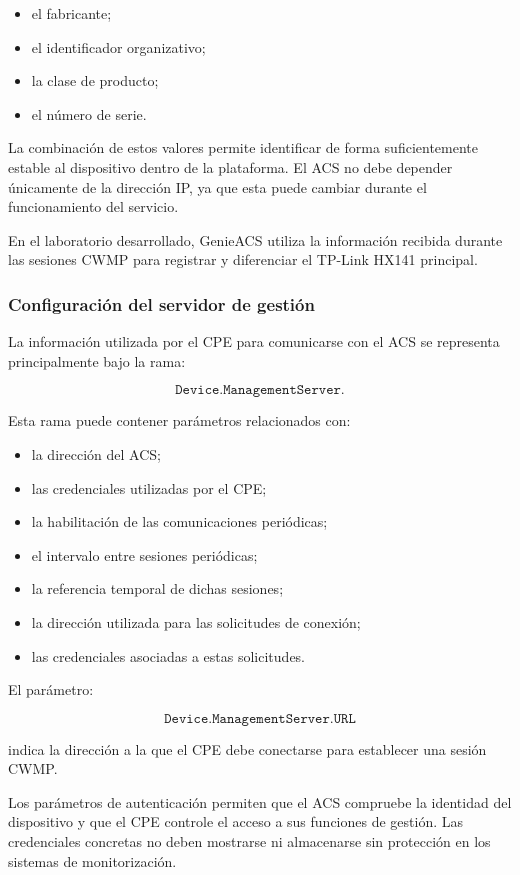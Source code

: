 \begin{itemize}
    \item el fabricante;
    \item el identificador organizativo;
    \item la clase de producto;
    \item el número de serie.
\end{itemize}

La combinación de estos valores permite identificar de forma
suficientemente estable al dispositivo dentro de la plataforma. El ACS no
debe depender únicamente de la dirección IP, ya que esta puede cambiar
durante el funcionamiento del servicio.

En el laboratorio desarrollado, GenieACS utiliza la información recibida
durante las sesiones CWMP para registrar y diferenciar el TP-Link HX141
principal.


\subsubsection*{Configuración del servidor de gestión}

La información utilizada por el CPE para comunicarse con el ACS se
representa principalmente bajo la rama:

\[
    \texttt{Device.ManagementServer.}
\]

Esta rama puede contener parámetros relacionados con:

\begin{itemize}
    \item la dirección del ACS;
    \item las credenciales utilizadas por el CPE;
    \item la habilitación de las comunicaciones periódicas;
    \item el intervalo entre sesiones periódicas;
    \item la referencia temporal de dichas sesiones;
    \item la dirección utilizada para las solicitudes de conexión;
    \item las credenciales asociadas a estas solicitudes.
\end{itemize}

El parámetro:

\[
    \texttt{Device.ManagementServer.URL}
\]

indica la dirección a la que el CPE debe conectarse para establecer una
sesión CWMP.

Los parámetros de autenticación permiten que el ACS compruebe la
identidad del dispositivo y que el CPE controle el acceso a sus funciones
de gestión. Las credenciales concretas no deben mostrarse ni almacenarse
sin protección en los sistemas de monitorización.

